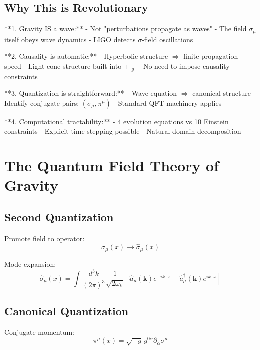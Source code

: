 \documentclass[11pt,a4paper]{article}
\theoremstyle{definition}
\theoremstyle{remark}
\begin{document}
		\subsection{Why This is Revolutionary}
		
		**1. Gravity IS a wave:**
		- Not "perturbations propagate as waves"
		- The field $\sigma_\mu$ itself obeys wave dynamics
		- LIGO detects $\sigma$-field oscillations
		
		**2. Causality is automatic:**
		- Hyperbolic structure $\Rightarrow$ finite propagation speed
		- Light-cone structure built into $\Box_g$
		- No need to impose causality constraints
		
		**3. Quantization is straightforward:**
		- Wave equation $\Rightarrow$ canonical structure
		- Identify conjugate pairs: $(\sigma_\mu, \pi^\mu)$
		- Standard QFT machinery applies
		
		**4. Computational tractability:**
		- 4 evolution equations vs 10 Einstein constraints
		- Explicit time-stepping possible
		- Natural domain decomposition
		
		\section{The Quantum Field Theory of Gravity}
		
		\subsection{Second Quantization}
		
		Promote field to operator:
		\begin{equation}
			\sigma_\mu(x) \rightarrow \hat{\sigma}_\mu(x)
		\end{equation}
		
		Mode expansion:
		\begin{equation}
			\hat{\sigma}_\mu(x) = \int \frac{d^3k}{(2\pi)^3}\frac{1}{\sqrt{2\omega_k}}\left[\hat{a}_\mu(\mathbf{k})e^{-ik\cdot x} + \hat{a}^\dagger_\mu(\mathbf{k})e^{ik\cdot x}\right]
		\end{equation}
		
		\subsection{Canonical Quantization}
		
		Conjugate momentum:
		\begin{equation}
			\pi^\mu(x) = \sqrt{-g}\,g^{0\alpha}\partial_\alpha\sigma^\mu
		\end{equation}
		
\end{document}
